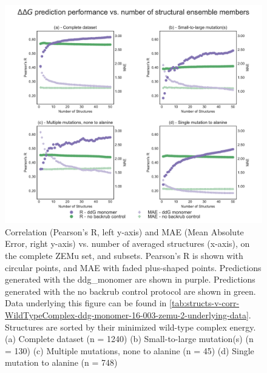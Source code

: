\begin{figure}
  \includegraphics[width=\textwidth,keepaspectratio]{structs-v-corr-WildTypeComplex-ddg-monomer-16-003-zemu-2.pdf}
  \caption[]{ %
    Correlation (Pearson's R, left y-axis) and MAE (Mean Absolute Error, right y-axis) vs. number of averaged structures (x-axis), on the complete ZEMu set, and subsets.
    Pearson's R is shown with circular points, and MAE with faded plus-shaped points.
    Predictions generated with the ddg\_monomer are shown in purple.
    Predictions generated with the no backrub control protocol are shown in green.
    Data underlying this figure can be found in \cref{tab:structs-v-corr-WildTypeComplex-ddg-monomer-16-003-zemu-2-underlying-data}.
    Structures are sorted by their minimized wild-type complex energy.
    (a) Complete dataset (n = 1240)
    (b) Small-to-large mutation(s) (n = 130)
    (c) Multiple mutations, none to alanine (n = 45)
    (d) Single mutation to alanine (n = 748)
  } \label{fig:structs-v-corr-WildTypeComplex-ddg-monomer-16-003-zemu-2}
\end{figure}
